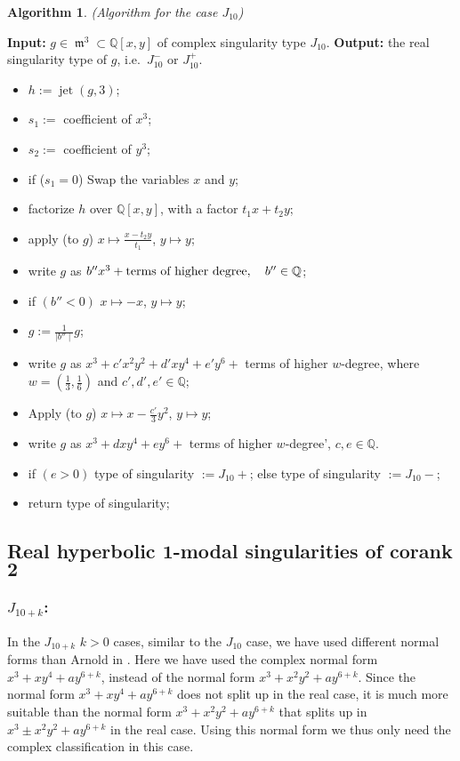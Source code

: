 \documentclass[noend]{amsproc}
\DeclareMathOperator{\m}{\mathfrak{m}}
\DeclareMathOperator{\jt}{jet}
\begin{document}
\newtheorem{J[10]}[kjet]{Algorithm}
\begin{J[10]}(Algorithm for the case $J_{10}$)
\end{J[10]}
\noindent\textnormal{\bf Input:} $g\in \m^3\subset\mathbb Q[x,y]$ of complex
singularity type $J_{10}$.\newline
\textnormal{\bf Output:} the real singularity type of $g$, i.e.~$J_{10}^-$ or
$J_{10}^+$.
\begin{itemize}
\item $h:= \jt(g,3)$;
\item $s_1:=$ coefficient of $x^3$;
\item $s_2:=$ coefficient of $y^3$;
\item if ($s_1=0$)\newline
\phantom{}\quad\quad Swap the variables $x$ and $y$;
\item factorize $h$ over $\mathbb Q[x,y]$, with a factor $t_1x+t_2y$;
\item apply (to $g$) $x\mapsto\frac{x-t_2y}{t_1}$, $y\mapsto y$;
\item write $g$ as
$b''x^3+\textnormal{terms of higher degree},\quad b''\in\mathbb Q$;
\item if $(b'' <0)$\newline
\phantom{}\quad $x\mapsto -x$, $y\mapsto y$;
\item $g:= \frac{1}{\mid b''\mid} g$;
\item write $g$ as $x^3+c'x^2y^2+d'xy^4+e'y^6+$ terms of higher $w$-degree,
where $w=(\frac{1}{3},\frac{1}{6})$ and $c',d',e'\in\mathbb Q$;
\item Apply (to $g$) $x\mapsto x-\frac{c'}{3}y^2$, $y\mapsto y$;
\item write $g$ as $x^3+dxy^4+ey^6+$ terms of higher $w$-degree',\quad
$c,e\in\mathbb Q$.
\item if $(e>0)$\newline
\phantom{}\quad  type of singularity $:=J_{10}+$;\newline
\phantom{}else\newline
\phantom{}\quad type of singularity $:=J_{10}-$;
\item return type of singularity;
\end{itemize}

\subsection{Real hyperbolic $\mathbf 1$-modal singularities of corank $\mathbf 2$}
\subsubsection{$J_{10+k}$:}In the $J_{10+k}$ $k>0$ cases, similar to the $J_{10}$ case, we have used
different normal forms than Arnold in \cite{AVG1985}.
Here we have used the complex normal form $x^3+xy^4+a y^{6+k}$, instead of the
normal form $x^3+x^2y^2+ay^{6+k}$. Since the normal form $x^3+xy^4+a y^{6+k}$
does not split up in the real case, it is much more suitable than the normal
form $x^3+x^2y^2+ay^{6+k}$ that splits up in $x^3\pm x^2y^2+ay^{6+k}$ in the
real case. Using this normal form we thus only need the complex classification
in this case.
\end{document}
